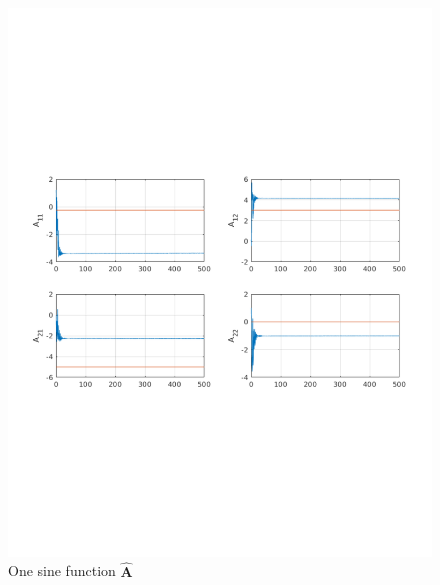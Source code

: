 \documentclass[]{article}
\begin{document}
\begin{figure}[H]
\centering
\includegraphics[width=1\columnwidth]{one_sine_A.pdf}
\caption{One sine function $\mathbf{\hat A}$}
\label{fig:one_sine_A}
\end{figure}
\end{document}
